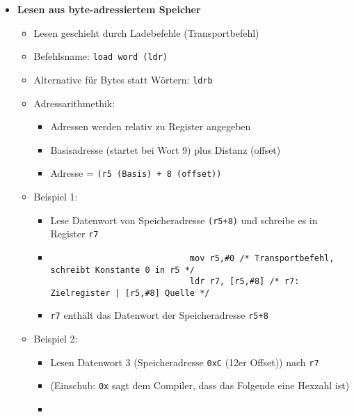 \begin{itemize}
        \item \textbf{Lesen aus byte-adressiertem Speicher}
            \begin{itemize}
                \item Lesen geschieht durch Ladebefehle (Transportbefehl)
                \item Befehlsname: \texttt{load word (ldr)}
                \item Alternative für Bytes statt Wörtern: \texttt{ldrb}
                \item Adressarithmethik: 
                \begin{itemize}
                    \item Adressen werden relativ zu Register angegeben
                    \item Basisadresse (startet bei Wort 9) plus Distanz (offset)
                    \item Adresse = \texttt{(r5 (Basis) + 8 (offset))}
                \end{itemize}
                \item Beispiel 1:
                    \begin{itemize}
                        \item Lese Datenwort von Speicheradresse \texttt{(r5+8)} und schreibe es in Register \texttt{r7}
                        \item[]
                            \begin{verbatim}
                            mov r5,#0 /* Transportbefehl, schreibt Konstante 0 in r5 */
                            ldr r7, [r5,#8] /* r7: Zielregister | [r5,#8] Quelle */
                            \end{verbatim}
                        \item \texttt{r7} enthält das Datenwort der Speicheradresse \texttt{r5+8}
                    \end{itemize}
                \item Beispiel 2:
                    \begin{itemize}
                        \item Lesen Datenwort 3 (Speicheradresse \texttt{0xC} (12er Offset)) nach \texttt{r7}
                        \item (Einschub: \texttt{0x} sagt dem Compiler, dass das Folgende eine Hexzahl ist)
                        \item[]
                            \begin{verbatim}

\end{verbatim}
\end{itemize}
\end{itemize}
\end{itemize}
